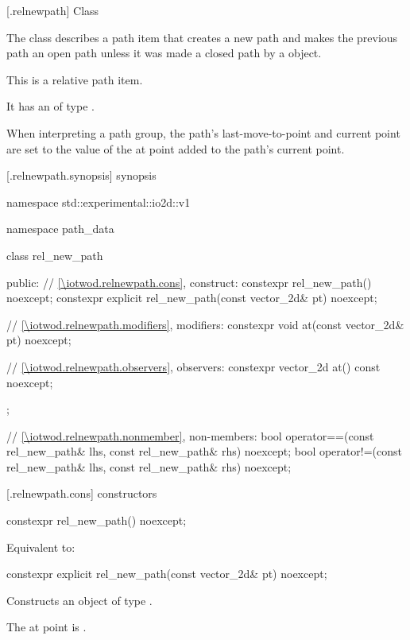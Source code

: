  [\iotwod.relnewpath] {Class }%

\pnum
{}%
The class  describes a path item that creates a new path and makes the previous path an open path unless it was made a closed path by a  object.

\pnum
This is a relative path item.

\pnum
It has an  of type .

\pnum
When interpreting a path group, the path's last-move-to-point and current point are set to the value of the at point added to the path's current point.

 [\iotwod.relnewpath.synopsis] { synopsis}%

\begin{codeblock}
namespace std::experimental::io2d::v1 {
  namespace path_data {
    class rel_new_path {
    public:
      // \ref{\iotwod.relnewpath.cons}, construct:
      constexpr rel_new_path() noexcept;
      constexpr explicit rel_new_path(const vector_2d& pt) noexcept;

      // \ref{\iotwod.relnewpath.modifiers}, modifiers:
      constexpr void at(const vector_2d& pt) noexcept;

      // \ref{\iotwod.relnewpath.observers}, observers:
      constexpr vector_2d at() const noexcept;
    };
    
    // \ref{\iotwod.relnewpath.nonmember}, non-members:
    bool operator==(const rel_new_path& lhs, const rel_new_path& rhs) noexcept;
    bool operator!=(const rel_new_path& lhs, const rel_new_path& rhs) noexcept;
  }
}
\end{codeblock}

 [\iotwod.relnewpath.cons] { constructors}%

%
\begin{itemdecl}
constexpr rel_new_path() noexcept;
\end{itemdecl}
\begin{itemdescr}
\pnum
\effects
Equivalent to: 
\end{itemdescr}

%
\begin{itemdecl}
constexpr explicit rel_new_path(const vector_2d& pt) noexcept;
\end{itemdecl}
\begin{itemdescr}
\pnum
\effects
Constructs an object of type .

\pnum
The at point is .
\end{itemdescr}

